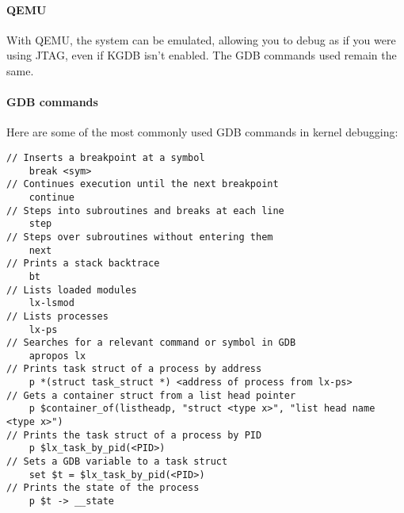\paragraph*{QEMU}
With QEMU, the system can be emulated, allowing you to debug as if you were using JTAG, even if KGDB isn't enabled. 
The GDB commands used remain the same.

\paragraph*{GDB commands}
Here are some of the most commonly used GDB commands in kernel debugging: 
\begin{verbatim} 
// Inserts a breakpoint at a symbol
    break <sym> 
// Continues execution until the next breakpoint
    continue 
// Steps into subroutines and breaks at each line
    step 
// Steps over subroutines without entering them
    next 
// Prints a stack backtrace
    bt
// Lists loaded modules 
    lx-lsmod 
// Lists processes
    lx-ps 
// Searches for a relevant command or symbol in GDB
    apropos lx 
// Prints task struct of a process by address
    p *(struct task_struct *) <address of process from lx-ps> 
// Gets a container struct from a list head pointer
    p $container_of(listheadp, "struct <type x>", "list head name <type x>") 
// Prints the task struct of a process by PID
    p $lx_task_by_pid(<PID>) 
// Sets a GDB variable to a task struct
    set $t = $lx_task_by_pid(<PID>) 
// Prints the state of the process
    p $t -> __state 
\end{verbatim}